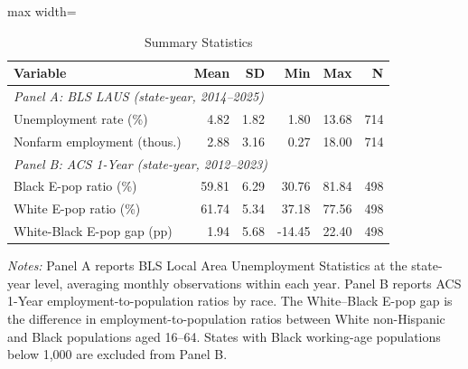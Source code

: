 \begin{table}[H]
\centering
\caption{Summary Statistics}
\begin{threeparttable}
\begin{adjustbox}{max width=\textwidth}
\begin{tabular}{lrrrrr}
\toprule
Variable & Mean & SD & Min & Max & N \\
\midrule
\multicolumn{6}{l}{\textit{Panel A: BLS LAUS (state-year, 2014--2025)}} \\
Unemployment rate (\%) & 4.82 & 1.82 & 1.80 & 13.68 & 714 \\
Nonfarm employment (thous.) & 2.88 & 3.16 & 0.27 & 18.00 & 714 \\
\midrule
\multicolumn{6}{l}{\textit{Panel B: ACS 1-Year (state-year, 2012--2023)}} \\
Black E-pop ratio (\%) & 59.81 & 6.29 & 30.76 & 81.84 & 498 \\
White E-pop ratio (\%) & 61.74 & 5.34 & 37.18 & 77.56 & 498 \\
White-Black E-pop gap (pp) & 1.94 & 5.68 & -14.45 & 22.40 & 498 \\
\bottomrule
\end{tabular}
\end{adjustbox}
\begin{tablenotes}[flushleft]
\small
\item \textit{Notes:} Panel A reports BLS Local Area Unemployment Statistics at the state-year level, averaging monthly observations within each year. Panel B reports ACS 1-Year employment-to-population ratios by race. The White--Black E-pop gap is the difference in employment-to-population ratios between White non-Hispanic and Black populations aged 16--64. States with Black working-age populations below 1,000 are excluded from Panel B.
\end{tablenotes}
\end{threeparttable}
\label{tab:summary}
\end{table}

